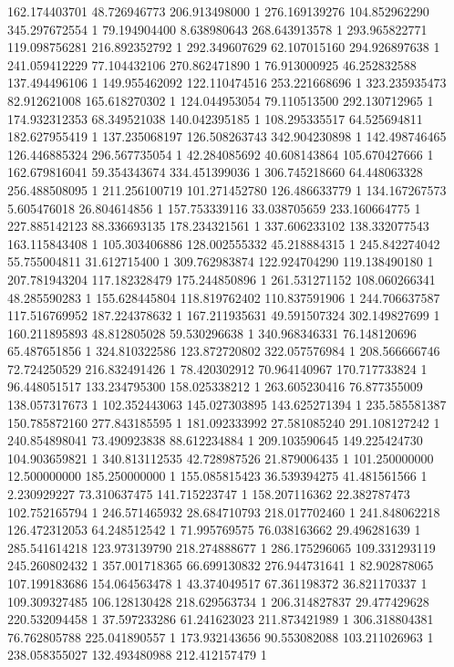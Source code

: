 162.174403701	48.726946773	206.913498000	1
276.169139276	104.852962290	345.297672554	1
79.194904400	8.638980643	268.643913578	1
293.965822771	119.098756281	216.892352792	1
292.349607629	62.107015160	294.926897638	1
241.059412229	77.104432106	270.862471890	1
76.913000925	46.252832588	137.494496106	1
149.955462092	122.110474516	253.221668696	1
323.235935473	82.912621008	165.618270302	1
124.044953054	79.110513500	292.130712965	1
174.932312353	68.349521038	140.042395185	1
108.295335517	64.525694811	182.627955419	1
137.235068197	126.508263743	342.904230898	1
142.498746465	126.446885324	296.567735054	1
42.284085692	40.608143864	105.670427666	1
162.679816041	59.354343674	334.451399036	1
306.745218660	64.448063328	256.488508095	1
211.256100719	101.271452780	126.486633779	1
134.167267573	5.605476018	26.804614856	1
157.753339116	33.038705659	233.160664775	1
227.885142123	88.336693135	178.234321561	1
337.606233102	138.332077543	163.115843408	1
105.303406886	128.002555332	45.218884315	1
245.842274042	55.755004811	31.612715400	1
309.762983874	122.924704290	119.138490180	1
207.781943204	117.182328479	175.244850896	1
261.531271152	108.060266341	48.285590283	1
155.628445804	118.819762402	110.837591906	1
244.706637587	117.516769952	187.224378632	1
167.211935631	49.591507324	302.149827699	1
160.211895893	48.812805028	59.530296638	1
340.968346331	76.148120696	65.487651856	1
324.810322586	123.872720802	322.057576984	1
208.566666746	72.724250529	216.832491426	1
78.420302912	70.964140967	170.717733824	1
96.448051517	133.234795300	158.025338212	1
263.605230416	76.877355009	138.057317673	1
102.352443063	145.027303895	143.625271394	1
235.585581387	150.785872160	277.843185595	1
181.092333992	27.581085240	291.108127242	1
240.854898041	73.490923838	88.612234884	1
209.103590645	149.225424730	104.903659821	1
340.813112535	42.728987526	21.879006435	1
101.250000000	12.500000000	185.250000000	1
155.085815423	36.539394275	41.481561566	1
2.230929227	73.310637475	141.715223747	1
158.207116362	22.382787473	102.752165794	1
246.571465932	28.684710793	218.017702460	1
241.848062218	126.472312053	64.248512542	1
71.995769575	76.038163662	29.496281639	1
285.541614218	123.973139790	218.274888677	1
286.175296065	109.331293119	245.260802432	1
357.001718365	66.699130832	276.944731641	1
82.902878065	107.199183686	154.064563478	1
43.374049517	67.361198372	36.821170337	1
109.309327485	106.128130428	218.629563734	1
206.314827837	29.477429628	220.532094458	1
37.597233286	61.241623023	211.873421989	1
306.318804381	76.762805788	225.041890557	1
173.932143656	90.553082088	103.211026963	1
238.058355027	132.493480988	212.412157479	1
